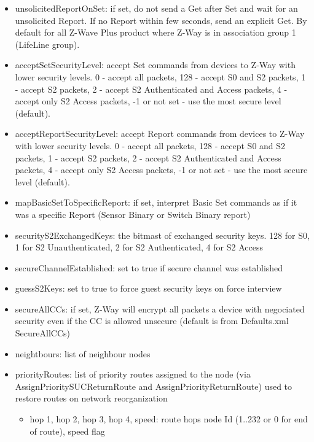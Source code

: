 \begin {itemize}
\begin {itemize}
\begin {itemize}
\item unsolicitedReportOnSet: if set, do not send a Get after Set and wait for an unsolicited Report. If no Report within few seconds, send an explicit Get. By default for all Z-Wave Plus product where Z-Way is in association group 1 (LifeLine group).
\item acceptSetSecurityLevel: accept Set commands from devices to Z-Way with lower security levels. 0 - accept all packets, 128 - accept S0 and S2 packets, 1 - accept S2 packets, 2 - accept S2 Authenticated and Access packets, 4 - accept only S2 Access packets, -1 or not set - use the most secure level (default).
\item acceptReportSecurityLevel: accept Report commands from devices to Z-Way with lower security levels. 0 - accept all packets, 128 - accept S0 and S2 packets, 1 - accept S2 packets, 2 - accept S2 Authenticated and Access packets, 4 - accept only S2 Access packets, -1 or not set - use the most secure level (default).
\item mapBasicSetToSpecificReport: if set, interpret Basic Set commands as if it was a specific Report (Sensor Binary or Switch Binary report)

\item securityS2ExchangedKeys: the bitmast of exchanged security keys. 128 for S0, 1 for S2 Unauthenticated, 2 for S2 Authenticated, 4 for S2 Access
\item secureChannelEstablished: set to true if secure channel was established
\item guessS2Keys: set to true to force guest security keys on force interview
\item secureAllCCs: if set, Z-Way will encrypt all packets a device with negociated security even if the CC is allowed unsecure (default is from Defaults.xml SecureAllCCs)

\item neightbours: list of neighbour nodes
\item priorityRoutes: list of priority routes assigned to the node (via AssignPrioritySUCReturnRoute and AssignPriorityReturnRoute) used to restore routes on network reorganization
\begin {itemize}
\item hop 1, hop 2, hop 3, hop 4, speed: route hops node Id (1..232 or 0 for end of route), speed flag
\end {itemize}


\end{itemize}
\end{itemize}
\end{itemize}
